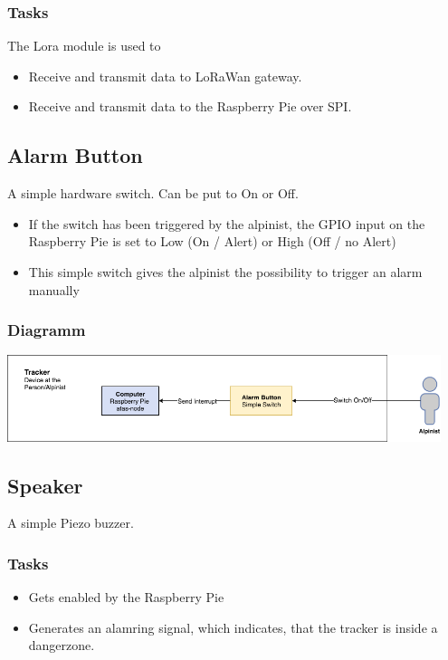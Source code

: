 \documentclass[a4paper,11pt, oneside]{report}
\theoremstyle{definition}
\begin{document}
\subsubsection{Tasks}
The Lora module is used to
\begin{itemize}
\item Receive and transmit data to LoRaWan gateway.
\item Receive and transmit data to the Raspberry Pie over SPI.
\end{itemize}

\newpage
\subsection{Alarm Button}
A simple hardware switch. Can be put to On or Off.
\begin{itemize}
\item If the switch has been triggered by the alpinist, the GPIO input on the Raspberry Pie is set to Low (On / Alert) or High (Off / no Alert)
\item This simple switch gives the alpinist the possibility to trigger an alarm manually
\end{itemize}

\subsubsection{Diagramm}
\includegraphics[width=0.95\textwidth]{img/ATAS_SystemOverview_Detail_AlarmButton.png}

\subsection{Speaker}
A simple Piezo buzzer.
\subsubsection{Tasks}
\begin{itemize}
\item Gets enabled by the Raspberry Pie
\item Generates an alamring signal, which indicates, that the tracker is inside a dangerzone.
\end{itemize}
\end{document}
